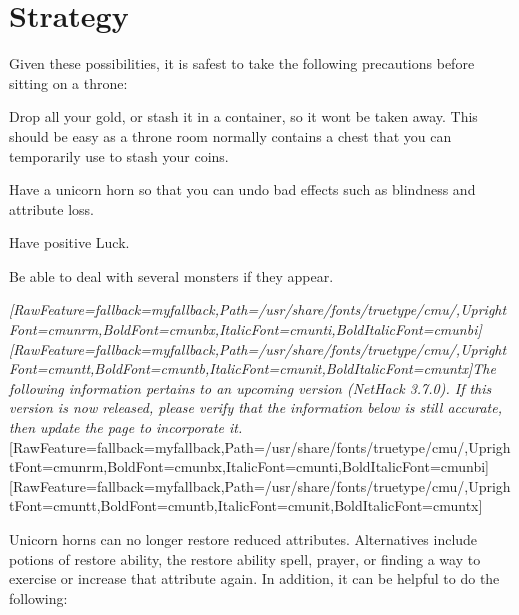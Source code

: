 \section{Strategy}
\label{7}
Given these possibilities, it is safest to take the following precautions before sitting on a throne:




\begin{myitemize}\item{}Drop all your gold, or stash it in a container\footnotemark[114], so it won\textquotesingle{}t be taken away. This should be easy as a throne room normally contains a chest\footnotemark[115] that you can temporarily use to stash your coins.
\item{}Have a unicorn horn\footnotemark[116] so that you can undo bad effects such as blindness\footnotemark[117] and attribute loss\footnotemark[118].
\item{}Have positive Luck.
\item{}Be able to deal with several monsters if they appear.
\end{myitemize}


{\itshape \allowbreak{}\setmainfont{cmunti.ttf}[RawFeature={fallback=myfallback},Path=/usr/share/fonts/truetype/cmu/,UprightFont=cmunrm,BoldFont=cmunbx,ItalicFont=cmunti,BoldItalicFont=cmunbi]\setmonofont{cmunti.ttf}[RawFeature={fallback=myfallback},Path=/usr/share/fonts/truetype/cmu/,UprightFont=cmuntt,BoldFont=cmuntb,ItalicFont=cmunit,BoldItalicFont=cmuntx]\itshape The following information pertains to an upcoming version (NetHack 3.7.0\footnotemark[119]). If this version is now released, please verify that the information below is still accurate, then update the page to incorporate it.}\allowbreak{}\setmainfont{cmunrm.ttf}[RawFeature={fallback=myfallback},Path=/usr/share/fonts/truetype/cmu/,UprightFont=cmunrm,BoldFont=cmunbx,ItalicFont=cmunti,BoldItalicFont=cmunbi]\setmonofont{cmunrm.ttf}[RawFeature={fallback=myfallback},Path=/usr/share/fonts/truetype/cmu/,UprightFont=cmuntt,BoldFont=cmuntb,ItalicFont=cmunit,BoldItalicFont=cmuntx]



Unicorn horns can no longer restore reduced attributes. Alternatives include potions of restore ability\footnotemark[120], the restore ability spell\footnotemark[121], prayer\footnotemark[122], or finding a way to exercise or increase that attribute again.
In addition, it can be helpful to do the following:




